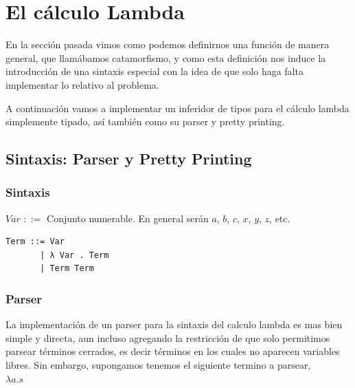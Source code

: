 \documentclass[a4paper,10pt]{article}
\begin{document}
  
  
  


\section{El cálculo Lambda}

En la sección pasada vimos como podemos definirnos una función de manera general,
que llamábamos catamorfismo, y como esta definición nos induce la introducción
de una sintaxis especial con la idea de que solo haga falta implementar lo relativo
al problema. 

A continuación vamos a implementar un inferidor de tipos para el cálculo lambda 
simplemente tipado, así también como su parser y pretty printing.

\subsection{Sintaxis: Parser y Pretty Printing}

\subsubsection{Sintaxis}

$Var$ $::=$ Conjunto numerable. En general serán $a$, $b$, $c$, $x$, $y$, $z$, etc.


\begin{lstlisting}
Term ::= Var
       | λ Var . Term
       | Term Term
\end{lstlisting}


\subsubsection{Parser}

La implementación de un parser para la sintaxis del calculo lambda es mas bien
simple y directa, aun incluso agregando la restricción de que solo permitimos parsear
términos cerrados, es decir términos en los cuales no aparecen variables libres.
Sin embargo, supongamos tenemos el siguiente termino a parsear,\\

$\lambda a . s$\\
\end{document}
